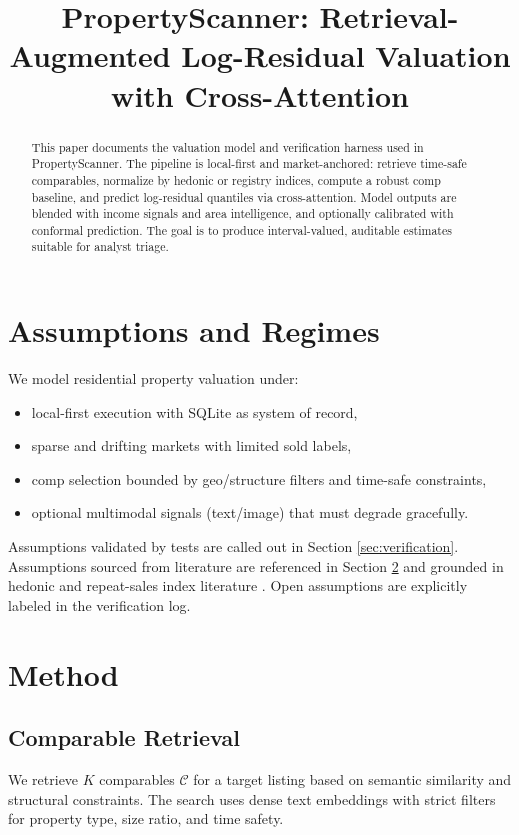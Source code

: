 \documentclass[11pt,a4paper]{article}
\title{PropertyScanner: Retrieval-Augmented Log-Residual Valuation with Cross-Attention}
\author{}
\date{}
\begin{document}
\maketitle

\begin{abstract}
This paper documents the valuation model and verification harness used in
PropertyScanner. The pipeline is local-first and market-anchored: retrieve
time-safe comparables, normalize by hedonic or registry indices, compute a
robust comp baseline, and predict log-residual quantiles via cross-attention.
Model outputs are blended with income signals and area intelligence, and
optionally calibrated with conformal prediction. The goal is to produce
interval-valued, auditable estimates suitable for analyst triage.
\end{abstract}

\section{Assumptions and Regimes}
\label{sec:assumptions}
We model residential property valuation under:
\begin{itemize}[leftmargin=1.5em]
  \item local-first execution with SQLite as system of record,
  \item sparse and drifting markets with limited sold labels,
  \item comp selection bounded by geo/structure filters and time-safe constraints,
  \item optional multimodal signals (text/image) that must degrade gracefully.
\end{itemize}
Assumptions validated by tests are called out in Section \ref{sec:verification}.
Assumptions sourced from literature are referenced in Section \ref{sec:method}
and grounded in hedonic and repeat-sales index literature
\cite{Rosen1974,BaileyMuthNourse1963,CaseShiller1987}.
Open assumptions are explicitly labeled in the verification log.

\section{Method}
\label{sec:method}
\subsection{Comparable Retrieval}
We retrieve $K$ comparables $\mathcal{C}$ for a target listing based on
semantic similarity and structural constraints. The search uses dense text
embeddings with strict filters for property type, size ratio, and time safety.
\end{document}
